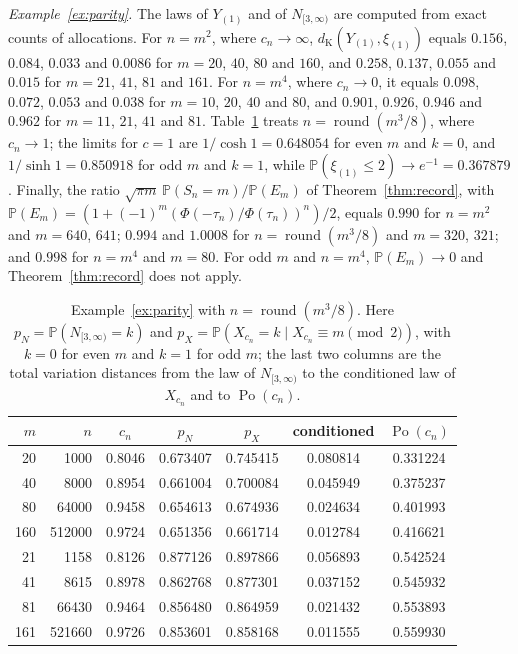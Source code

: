 \documentclass[11pt]{amsart}
\theoremstyle{definition}
\theoremstyle{remark}
\numberwithin{equation}{section}
\newcommand{\Pp}{\mathbb P}
\newcommand{\dK}{d_{\mathrm K}}
\DeclareMathOperator{\Po}{Po}
\begin{document}
\emph{Example~\ref{ex:parity}.} The laws of $Y_{(1)}$ and of $N_{[3,\infty)}$ are computed from exact counts of allocations. For $n=m^2$, where $c_n\to\infty$, $\dK(Y_{(1)},\xi_{(1)})$ equals $0.156$, $0.084$, $0.033$ and $0.0086$ for $m=20$, $40$, $80$ and $160$, and $0.258$, $0.137$, $0.055$ and $0.015$ for $m=21$, $41$, $81$ and $161$. For $n=m^4$, where $c_n\to0$, it equals $0.098$, $0.072$, $0.053$ and $0.038$ for $m=10$, $20$, $40$ and $80$, and $0.901$, $0.926$, $0.946$ and $0.962$ for $m=11$, $21$, $41$ and $81$. Table~\ref{tab:parity} treats $n=\operatorname{round}(m^3/8)$, where $c_n\to1$; the limits for $c=1$ are $1/\cosh1=0.648054$ for even $m$ and $k=0$, and $1/\sinh1=0.850918$ for odd $m$ and $k=1$, while $\Pp(\xi_{(1)}\le2)\to e^{-1}=0.367879$. Finally, the ratio $\sqrt{\pi m}\,\Pp(S_n=m)/\Pp(E_m)$ of Theorem~\ref{thm:record}, with $\Pp(E_m)=(1+(-1)^m(\Phi(-\tau_n)/\Phi(\tau_n))^n)/2$, equals $0.990$ for $n=m^2$ and $m=640$, $641$; $0.994$ and $1.0008$ for $n=\operatorname{round}(m^3/8)$ and $m=320$, $321$; and $0.998$ for $n=m^4$ and $m=80$. For odd $m$ and $n=m^4$, $\Pp(E_m)\to0$ and Theorem~\ref{thm:record} does not apply.

\begin{table}[ht]
\caption{Example~\ref{ex:parity} with $n=\operatorname{round}(m^3/8)$. Here $p_N=\Pp(N_{[3,\infty)}=k)$ and $p_X=\Pp(X_{c_n}=k\mid X_{c_n}\equiv m\pmod2)$, with $k=0$ for even $m$ and $k=1$ for odd $m$; the last two columns are the total variation distances from the law of $N_{[3,\infty)}$ to the conditioned law of $X_{c_n}$ and to $\Po(c_n)$.}\label{tab:parity}
\centering
\begin{tabular}{rrccccc}
\toprule
$m$&$n$&$c_n$&$p_N$&$p_X$&conditioned&$\Po(c_n)$\\
\midrule
20&1000&0.8046&0.673407&0.745415&0.080814&0.331224\\
40&8000&0.8954&0.661004&0.700084&0.045949&0.375237\\
80&64000&0.9458&0.654613&0.674936&0.024634&0.401993\\
160&512000&0.9724&0.651356&0.661714&0.012784&0.416621\\
\midrule
21&1158&0.8126&0.877126&0.897866&0.056893&0.542524\\
41&8615&0.8978&0.862768&0.877301&0.037152&0.545932\\
81&66430&0.9464&0.856480&0.864959&0.021432&0.553893\\
161&521660&0.9726&0.853601&0.858168&0.011555&0.559930\\
\bottomrule
\end{tabular}
\end{table}
\end{document}
